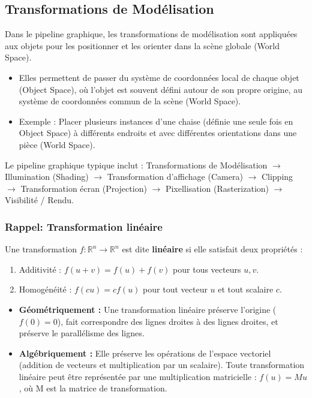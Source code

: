 \documentclass{article}
\begin{document}
\subsection{Transformations de Modélisation}

Dans le pipeline graphique, les transformations de modélisation sont appliquées aux objets pour les positionner et les orienter dans la scène globale (World Space).

\begin{itemize}
    \item Elles permettent de passer du système de coordonnées local de chaque objet (Object Space), où l'objet est souvent défini autour de son propre origine, au système de coordonnées commun de la scène (World Space).
    \item Exemple : Placer plusieurs instances d'une chaise (définie une seule fois en Object Space) à différents endroits et avec différentes orientations dans une pièce (World Space).
\end{itemize}

Le pipeline graphique typique inclut :
Transformations de Modélisation $\to$ Illumination (Shading) $\to$ Transformation d'affichage (Camera) $\to$ Clipping $\to$ Transformation écran (Projection) $\to$ Pixellisation (Rasterization) $\to$ Visibilité / Rendu.

\subsubsection{Rappel: Transformation linéaire}

Une transformation $f: \mathbb{R}^n \to \mathbb{R}^n$ est dite \textbf{linéaire} si elle satisfait deux propriétés :
\begin{enumerate}
    \item Additivité : $f(u + v) = f(u) + f(v)$ pour tous vecteurs $u, v$.
    \item Homogénéité : $f(c u) = c f(u)$ pour tout vecteur $u$ et tout scalaire $c$.
\end{enumerate}

\begin{itemize}
    \item \textbf{Géométriquement :} Une transformation linéaire préserve l'origine ($f(0) = 0$), fait correspondre des lignes droites à des lignes droites, et préserve le parallélisme des lignes.
    \item \textbf{Algébriquement :} Elle préserve les opérations de l'espace vectoriel (addition de vecteurs et multiplication par un scalaire). Toute transformation linéaire peut être représentée par une multiplication matricielle : $f(u) = M u$, où M est la matrice de transformation.
\end{itemize}
\end{document}
